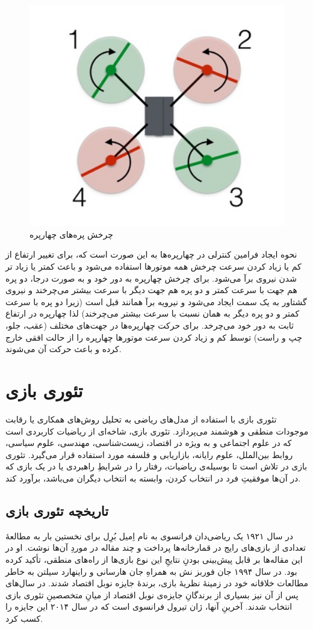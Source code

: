 \begin{figure}[H]
	\includegraphics[width=12cm]{figs/introduction/Quadblade.jpg}
	\centering
	\caption{چرخش پره‌های چهارپره
		\cite{Quadhowfly}}
\end{figure}
نحوه ایجاد فرامین کنترلی در چهارپره‌ها به این صورت است که، برای تغییر ارتفاع از کم یا زیاد کردن سرعت چرخش همه موتورها استفاده می‌شود و باعث کمتر یا زیاد تر شدن نیروی برآ می‌شود. برای چرخش چهارپره به دور خود و به صورت درجا، دو پره هم جهت با سرعت کمتر و دو پره هم جهت دیگر با سرعت بیشتر می‌چرخند و نیروی گشتاور به یک سمت ایجاد می‌شود و نیرویه برآ همانند قبل است (زیرا دو پره با سرعت کمتر و دو پره دیگر به همان نسبت با سرعت بیشتر می‌چرخند) لذا چهارپره در ارتفاع ثابت به دور خود می‌چرخد. برای حرکت چهارپره‌ها در جهت‌های مختلف (عقب، جلو، چپ و راست) توسط کم و زیاد کردن سرعت موتورها چهارپره را از حالت افقی خارج کرده و باعث حرکت آن می‌شوند.


\section{تئوری بازی}
تئوری بازی با استفاده از مدل‌های ریاضی به تحلیل روش‌های همکاری یا رقابت موجودات منطقی و هوشمند می‌پردازد. تئوری بازی، شاخه‌ای از ریاضیات کاربردی است که در علوم اجتماعی و به ویژه در اقتصاد، زیست‌شناسی، مهندسی، علوم سیاسی، روابط بین‌الملل، علوم رایانه، بازاریابی و فلسفه مورد استفاده قرار می‌گیرد. تئوری بازی در تلاش است تا بوسیله‌ی ریاضیات، رفتار را در شرایطِ راهبردی یا در یک بازی که در آن‌ها موفقیتِ فرد در انتخاب کردن، وابسته به انتخاب دیگران می‌باشد، برآورد کند.
\subsection{تاریخچه تئوری بازی}
در سال ۱۹۲۱ یک ریاضی‌دان فرانسوی به نام اِمیل بُرِل برای نخستین بار به مطالعهٔ تعدادی از بازی‌های رایج در قمارخانه‌ها پرداخت و چند مقاله در موردِ آن‌ها نوشت. او در این مقاله‌ها بر قابل پیش‌بینی بودنِ نتایجِ این نوع بازی‌ها از راه‌های منطقی، تأکید کرده بود. در سال ۱۹۹۴ جان فوربز نش به همراهِ جان هارسانی و راینهارد سیلتن به خاطر مطالعات خلاقانه خود در زمینهٔ نظریهٔ بازی، برندهٔ جایزه نوبل اقتصاد شدند. در سال‌های پس از آن نیز بسیاری از برندگانِ جایزه‌ی نوبل اقتصاد از میانِ متخصصینِ تئوری بازی انتخاب شدند. آخرینِ آنها، ژان تیرول فرانسوی است که در سال ۲۰۱۴ این جایزه را کسب کرد.
